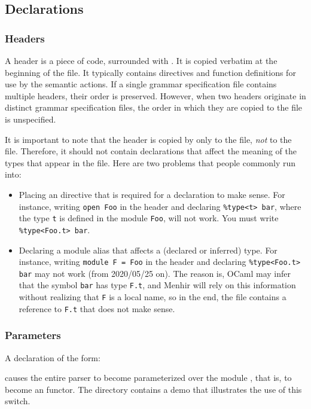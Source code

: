 \documentclass[onecolumn,11pt,nocopyrightspace,preprint]{sigplanconf}
\begin{document}
\subsection{Declarations}
\label{sec:decls}

\subsubsection{Headers}
\label{sec:decls:headers}

A header is a piece of \ocaml code, surrounded with . It is
copied verbatim at the beginning of the \ml file. It typically contains \ocaml
{} directives and function definitions for use by the semantic
actions. If a single grammar specification file contains multiple headers,
their order is preserved. However, when two headers originate in distinct
grammar specification files, the order in which they are copied to the \ml
file is unspecified.

It is important to note that the header is copied by \menhir only to the \ml
file, \emph{not} to the \mli file. Therefore, it should not contain
declarations that affect the meaning of the types that appear in the \mli
file. Here are two problems that people commonly run into:
\begin{itemize}
\item Placing an  directive that is required for a \dtype declaration
  to make sense. For instance, writing \verb+open Foo+ in the header and
  declaring \verb+%type<t> bar+, where the type \verb+t+ is defined in the
  module \verb+Foo+, will not work. You must write \verb+%type<Foo.t> bar+.
\item Declaring a module alias that affects a (declared or inferred) type. For
  instance, writing \verb+module F = Foo+ in the header and declaring
  \verb+%type<Foo.t> bar+ may not work (from
  2020/05/25 on). The reason is, OCaml may infer that the symbol \verb+bar+ has
  type \verb+F.t+, and Menhir will rely on this information without realizing
  that \verb+F+ is a local name, so in the end, the \mli file contains a
  reference to \verb+F.t+ that does not make sense.
\end{itemize}

\subsubsection{Parameters}
\label{sec:parameter}

A declaration of the form:
\begin{quote}
\dparameter \ocamlparam
\end{quote}
causes the entire parser to become parameterized over the \ocaml module
, that is, to become an \ocaml functor. The directory
 contains a demo that illustrates the use of this switch.
\end{document}
